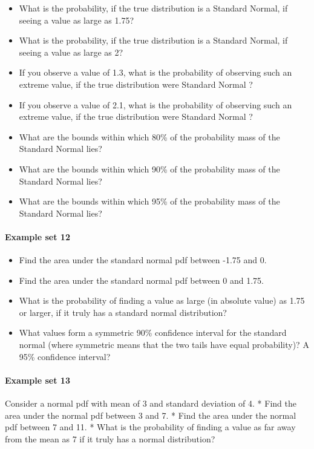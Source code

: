 \documentclass[]{article}
\providecommand{\tightlist}{%
  \setlength{\itemsep}{0pt}\setlength{\parskip}{0pt}}
\let\oldparagraph\paragraph
\renewcommand{\paragraph}[1]{\oldparagraph{#1}\mbox{}}
\begin{document}
\begin{itemize}
\tightlist
\item
  What is the probability, if the true distribution is a Standard
  Normal, if seeing a value as large as 1.75?
\item
  What is the probability, if the true distribution is a Standard
  Normal, if seeing a value as large as 2?
\item
  If you observe a value of 1.3, what is the probability of observing
  such an extreme value, if the true distribution were Standard Normal ?
\item
  If you observe a value of 2.1, what is the probability of observing
  such an extreme value, if the true distribution were Standard Normal ?
\item
  What are the bounds within which 80\% of the probability mass of the
  Standard Normal lies?
\item
  What are the bounds within which 90\% of the probability mass of the
  Standard Normal lies?
\item
  What are the bounds within which 95\% of the probability mass of the
  Standard Normal lies?
\end{itemize}

\paragraph{Example set 12}\label{example-set-12}

\begin{itemize}
\tightlist
\item
  Find the area under the standard normal pdf between -1.75 and 0.
\item
  Find the area under the standard normal pdf between 0 and 1.75.
\item
  What is the probability of finding a value as large (in absolute
  value) as 1.75 or larger, if it truly has a standard normal
  distribution?
\item
  What values form a symmetric 90\% confidence interval for the standard
  normal (where symmetric means that the two tails have equal
  probability)? A 95\% confidence interval?
\end{itemize}

\paragraph{Example set 13}\label{example-set-13}

Consider a normal pdf with mean of 3 and standard deviation of 4. * Find
the area under the normal pdf between 3 and 7. * Find the area under the
normal pdf between 7 and 11. * What is the probability of finding a
value as far away from the mean as 7 if it truly has a normal
distribution?
\end{document}

